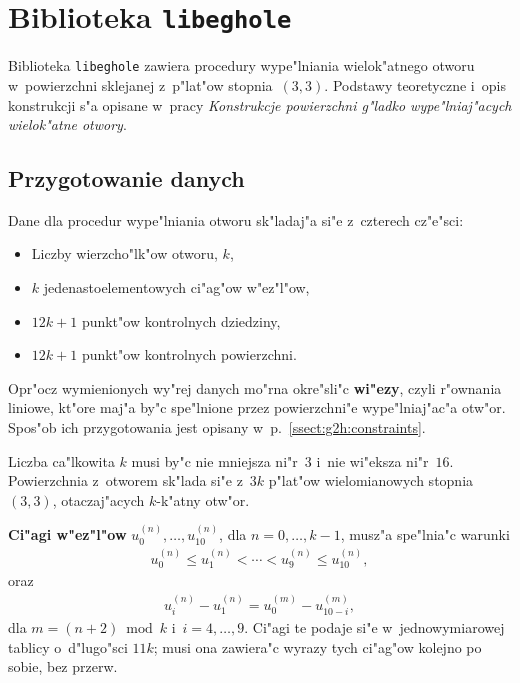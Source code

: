 

\chapter{Biblioteka \texttt{libeghole}}

Biblioteka \texttt{libeghole} zawiera procedury wype"lniania wielok"atnego
otworu w~powierzchni sklejanej z~p"lat"ow stopnia~$(3,3)$. Podstawy
teoretyczne i~opis konstrukcji s"a opisane w~pracy \emph{Konstrukcje
powierzchni g"ladko wype"lniaj"acych wielok"atne otwory}.

\section{\label{sect:G2:data}Przygotowanie danych}

Dane dla procedur wype"lniania otworu sk"ladaj"a si"e z~czterech cz"e"sci:
\begin{itemize}
  \item Liczby wierzcho"lk"ow otworu, $k$,
  \item $k$ jedenastoelementowych ci"ag"ow w"ez"l"ow,
  \item $12k+1$ punkt"ow kontrolnych dziedziny,
  \item $12k+1$ punkt"ow kontrolnych powierzchni.
\end{itemize}
Opr"ocz wymienionych wy"rej danych mo"rna okre"sli"c \textbf{wi"ezy}, czyli
r"ownania liniowe, kt"ore maj"a by"c spe"lnione przez powierzchni"e
wype"lniaj"ac"a otw"or. Spos"ob ich przygotowania jest opisany
w~p.~\ref{ssect:g2h:constraints}.

Liczba ca"lkowita $k$ musi by"c nie mniejsza ni"r~$3$ i~nie wi"eksza
ni"r~$16$. Powierzchnia z~otworem sk"lada si"e z~$3k$ p"lat"ow wielomianowych
stopnia~$(3,3)$, otaczaj"acych \mbox{$k$-k"atny} otw"or.

\textbf{Ci"agi w"ez"l"ow} $u^{(n)}_0,\ldots,u^{(n)}_{10}$, dla $n=0,\ldots,k-1$,
musz"a spe"lnia"c warunki
\begin{align*}
  u^{(n)}_0\leq u^{(n)}_1<\cdots<u^{(n)}_9\leq u^{(n)}_{10},
\end{align*}
oraz
\begin{align*}
  u^{(n)}_i-u^{(n)}_1 = u^{(m)}_0-u^{(m)}_{10-i},
\end{align*}
dla $m=(n+2)\bmod k$ i~$i=4,\ldots,9$.
Ci"agi te podaje si"e w~jednowymiarowej tablicy o~d"lugo"sci $11k$;
musi ona zawiera"c wyrazy tych ci"ag"ow kolejno po sobie, bez przerw.

